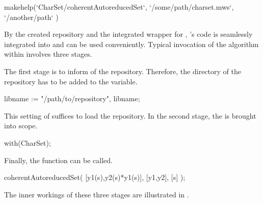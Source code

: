 \begin{mapleprogram}
makehelp(`CharSet/coherentAutoreducedSet`,
         `/some/path/charset.mws`,
         `/another/path`
    )
\end{mapleprogram}

By the created repository and the integrated wrapper for \exportedsymbol, \Aldor's code is seamlessly integrated into \Maple and can be used conveniently. Typical invocation of the algorithm within involves three stages. 

The first stage is to inform \Maple of the repository. Therefore, the directory of the repository has to be added to the  variable.

\begin{mapleprogram}
libname := "/path/to/repository", libname;
\end{mapleprogram} 

This setting of  suffices to load the repository. In the second stage, the   is brought into scope.

\begin{mapleprogram}
with(CharSet);
\end{mapleprogram} 

Finally, the  function can be called.
\begin{mapleprogram}
coherentAutoreducedSet( [y1(s),y2(s)*y1(s)], [y1,y2], [s] );
\end{mapleprogram} 

The inner workings of these three stages are illustrated in .


